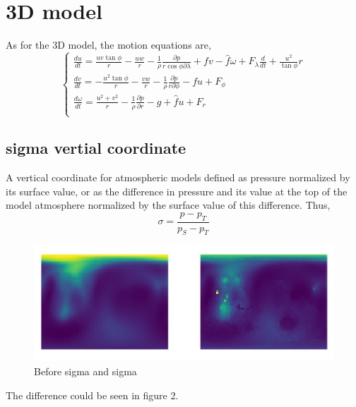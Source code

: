 \documentclass{article}
\begin{document}
\section{3D model}
As for the 3D model, the motion equations are,
\begin{equation}
    \begin{cases}
        \frac{du}{dt}=\frac{uv\tan\phi}{r}-\frac{uw}{r}-\frac{1}{\rho}\frac{\partial p}{r\cos\phi\partial\lambda}+fv-\hat{f}\omega+F_{\lambda}\frac{d}{dt}+\frac{u^2}{\tan\phi}{r} \\
        \frac{dv}{dt}=-\frac{u^2\tan\phi}{r}-\frac{vw}{r}-\frac{1}{\rho}\frac{\partial p}{r\partial \phi}-fu+F_{\phi} \\    
        \frac{d\omega}{dt}=\frac{u^2+v^2}{r}-\frac{1}{\rho}\frac{\partial p}{\partial r}-g+\hat{f}u+F_r\\
    \end{cases}
\end{equation}
\subsection{sigma vertial coordinate}
A vertical coordinate for atmospheric models defined as pressure normalized by its surface value, or as the difference in pressure and its value at the top
of the model atmosphere normalized by the surface value of this difference. \newline
Thus,
\begin{equation}
    \sigma=\frac{p-p_T}{p_S-p_T}
\end{equation}

\begin{figure}
    \centering
    \includegraphics[scale=0.45]{./imgs/wiki/sigma_diff.JPG}
    \caption{Before sigma and sigma}     
    \label{fig:2}
\end{figure}
The difference could be seen in figure 2.
\end{document}
